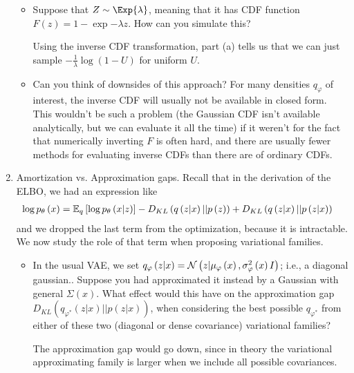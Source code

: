 \documentclass{article}
\begin{document}
\begin{enumerate}
\begin{itemize}
\item Suppose that $Z \sim \Exp{\lambda}$, meaning that it has CDF function
  $F\left(z\right) = 1 - \exp{-\lambda z}$. How can you simulate this?
  
  Using the inverse CDF transformation, part (a) tells us that we can just
  sample $-\frac{1}{\lambda}\log \left(1 - U\right)$ for uniform $U$.

\item Can you think of downsides of this approach?
  For many densities $q_{\varphi}$ of interest, the inverse CDF will usually not
  be available in closed form. This wouldn't be such a problem (the Gaussian CDF
  isn't available analytically, but we can evaluate it all the time) if it
  weren't for the fact that numerically inverting $F$ is often hard, and there
  are usually fewer methods for evaluating inverse CDFs than there are of
  ordinary CDFs.

\end{itemize}

\item Amortization vs. Approximation gaps. Recall that in the derivation of the
  ELBO, we had an expression like
  \begin{align*}
    \log p_{\theta}\left(x\right) &= \mathbb{E}_{q}\left[{\log p_{\theta}\left(x \vert
      z\right)}\right] - D_{KL}\left(q\left(z \vert x\right) \vert \vert
    p\left(z\right)\right) + D_{KL}\left(q\left(z \vert x\right) \vert \vert
    p\left(z \vert x\right)\right)
  \end{align*}
  and we dropped the last term from the optimization, because it is intractable.
  We now study the role of that term when proposing variational families.

  \begin{itemize}
  \item In the usual VAE, we set $q_{\varphi}\left(z \vert x\right) =
    \mathcal{N}\left(z \vert \mu_{\varphi}\left(x\right),
    \sigma_{\varphi}^{2}\left(x\right)I\right)$; i.e., a diagonal gaussian..
    Suppose you had approximated it instead by a Gaussian with general
    $\Sigma\left(x\right)$. What effect would this have on the approximation gap
    $D_{KL}\left(q_{\varphi^{\ast}}\left(z \vert x\right) \vert \vert p\left(z
    \vert x\right)\right)$, when considering the best possible
    $q_{\varphi^\ast}$ from either of these two (diagonal or dense covariance)
    variational families?

    The approximation gap would go down, since in theory the variational
    approximating family is larger when we include all possible covariances.


\end{itemize}
\end{enumerate}
\end{document}
